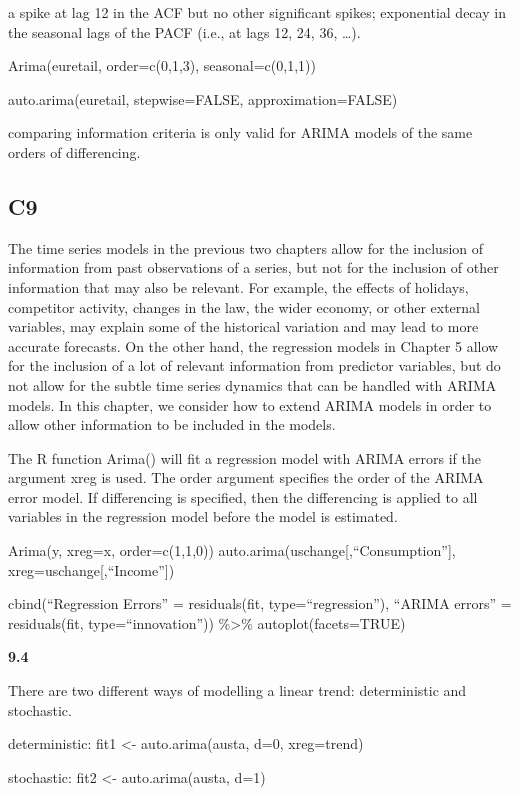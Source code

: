 \documentclass[]{book}
\begin{document}
a spike at lag 12 in the ACF but no other significant spikes;
exponential decay in the seasonal lags of the PACF (i.e., at lags 12,
24, 36, \ldots{}).

Arima(euretail, order=c(0,1,3), seasonal=c(0,1,1))

auto.arima(euretail, stepwise=FALSE, approximation=FALSE)

comparing information criteria is only valid for ARIMA models of the
same orders of differencing.

\subsection{C9}\label{c9}

The time series models in the previous two chapters allow for the
inclusion of information from past observations of a series, but not for
the inclusion of other information that may also be relevant. For
example, the effects of holidays, competitor activity, changes in the
law, the wider economy, or other external variables, may explain some of
the historical variation and may lead to more accurate forecasts. On the
other hand, the regression models in Chapter 5 allow for the inclusion
of a lot of relevant information from predictor variables, but do not
allow for the subtle time series dynamics that can be handled with ARIMA
models. In this chapter, we consider how to extend ARIMA models in order
to allow other information to be included in the models.

The R function Arima() will fit a regression model with ARIMA errors if
the argument xreg is used. The order argument specifies the order of the
ARIMA error model. If differencing is specified, then the differencing
is applied to all variables in the regression model before the model is
estimated.

Arima(y, xreg=x, order=c(1,1,0))
auto.arima(uschange{[},``Consumption''{]},
xreg=uschange{[},``Income''{]})

cbind(``Regression Errors'' = residuals(fit, type=``regression''),
``ARIMA errors'' = residuals(fit, type=``innovation''))
\%\textgreater{}\% autoplot(facets=TRUE)

\textbf{9.4}

There are two different ways of modelling a linear trend: deterministic
and stochastic.

deterministic: fit1 \textless{}- auto.arima(austa, d=0, xreg=trend)

stochastic: fit2 \textless{}- auto.arima(austa, d=1)
\end{document}
